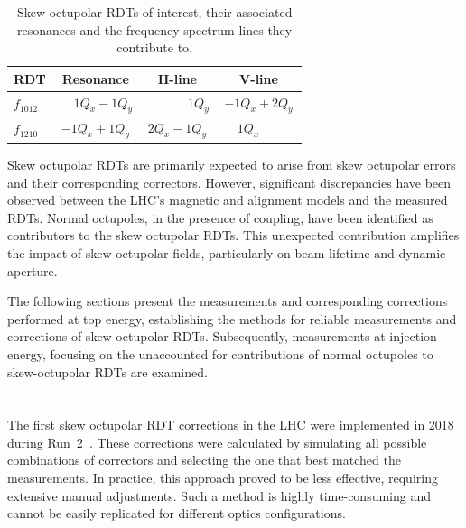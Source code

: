 \begin{table}[!htb]
    \centering
    \begin{tabular}{lccc}
      \toprule
      RDT         & Resonance                &  H-line                    & V-line         \\
      \midrule
      $f_{1012}$  & $\phantom{-}1Q_x - 1Q_y$ &  $\phantom{2Q_x-\ \,}1Q_y$ & $-1Q_x + 2Q_y$ \\
      $f_{1210}$  & $-1Q_x + 1Q_y$           &  $2Q_x - 1Q_y$             & $\phantom{-}1Q_x\phantom{+2Q_y\ \,}$    \\
      \bottomrule
    \end{tabular}
    \caption{Skew octupolar RDTs of interest, their associated resonances and the frequency spectrum
    lines they contribute to.}
    \label{tab:skew_octupolar:resonances_rdts}
\end{table}

Skew octupolar RDTs are primarily expected to arise from skew octupolar errors and their
corresponding correctors. However, significant discrepancies have been observed between the LHC's
magnetic and alignment models and the measured RDTs. Normal octupoles, in the presence of coupling,
have been identified as contributors to the skew octupolar RDTs. This unexpected contribution
amplifies the impact of skew octupolar fields, particularly on beam lifetime and dynamic aperture.

The following sections present the measurements and corresponding corrections performed at top
energy, establishing the methods for reliable measurements and corrections of skew-octupolar RDTs.
Subsequently, measurements at injection energy, focusing on the unaccounted for contributions of
normal octupoles to skew-octupolar RDTs are examined.



\section{}

The first skew octupolar RDT corrections in the LHC were implemented in 2018 during
Run~2~\cite{carlier_nonlinear_2020}. These corrections were calculated by simulating all possible
combinations of correctors and selecting the one that best matched the measurements. In practice,
this approach proved to be less effective, requiring extensive manual adjustments. Such a method is
highly time-consuming and cannot be easily replicated for different optics configurations.

